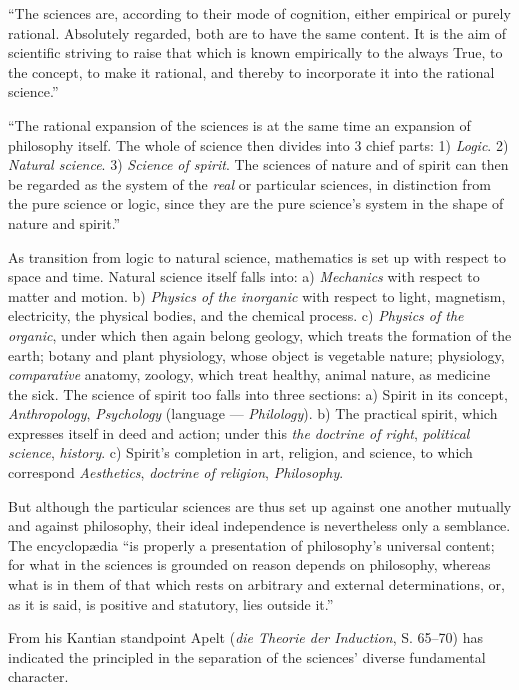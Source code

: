 \documentclass[12pt]{book}
\begin{document}
``The sciences are, according to their mode of cognition, either empirical or purely rational.
Absolutely regarded, both are to have the same content. It is the aim of scientific striving
to raise that which is known empirically to the always True, to the concept, to make it
rational, and thereby to incorporate it into the rational science.''

``The rational expansion of the sciences is at the same time an expansion of philosophy
itself. The whole of science then divides into 3 chief parts: 1) \emph{Logic}. 2) \emph{Natural
science}. 3) \emph{Science of spirit}. The sciences of nature and of spirit can then be regarded
as the system of the \emph{real} or particular sciences, in distinction from the pure science
or logic, since they are the pure science's system in the shape of nature and spirit.''

As transition from logic to natural science, mathematics is set up with respect to space and
time. Natural science itself falls into: a) \emph{Mechanics} with respect to matter and motion.
b) \emph{Physics of the inorganic} with respect to light, magnetism, electricity, the physical
bodies, and the chemical process. c) \emph{Physics of the organic}, under which then again
belong geology, which
treats the formation of the earth; botany and plant physiology, whose object is vegetable
nature; physiology, \emph{comparative} anatomy, zoology, which treat healthy, animal nature, as
medicine the sick. The science of spirit too falls into three sections: a) Spirit in its concept,
\emph{Anthropology}, \emph{Psychology} (language — \emph{Philology}). b) The practical spirit,
which expresses itself in deed and action; under this \emph{the doctrine of right}, \emph{political
science}, \emph{history}. c) Spirit's completion in art, religion, and science, to which correspond
\emph{Aesthetics}, \emph{doctrine of religion}, \emph{Philosophy}.

But although the particular sciences are thus set up against one another mutually and against
philosophy, their ideal independence is nevertheless only a semblance. The encyclopædia ``is
properly a presentation of philosophy's universal content; for what in the sciences is grounded
on reason depends on philosophy, whereas what is in them of that which rests on arbitrary and
external determinations, or, as it is said, is positive and statutory, lies outside it.''

From his Kantian standpoint Apelt (\textit{die Theorie der Induction}, S. 65--70) has indicated
the principled in the separation of the sciences' diverse fundamental character.
\end{document}
